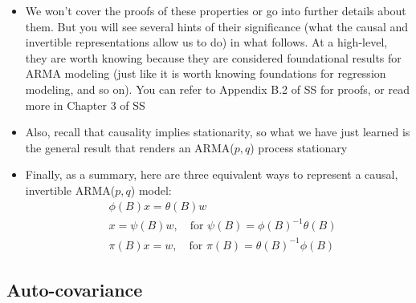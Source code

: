 \documentclass{article}
\begin{document}
\begin{itemize}
\item We won't cover the proofs of these properties or go into further details
  about them. But you will see several hints of their significance (what the
  causal and invertible representations allow us to do) in what follows. At 
  a high-level, they are worth knowing because they are considered foundational 
  results for ARMA modeling (just like it is worth knowing foundations for 
  regression modeling, and so on). You can refer to Appendix B.2 of SS for
  proofs, or read more in Chapter 3 of SS

\item Also, recall that causality implies stationarity, so what we have just
  learned is the general result that renders an ARMA($p,q$) process stationary 

\item Finally, as a summary, here are three equivalent ways to represent a
  causal, invertible ARMA($p,q$) model:
  \begin{align*}
  &\phi(B) x = \theta(B) w \\
  &x = \psi(B) w, \quad \text{for $\psi(B) = \phi(B)^{-1} \theta(B)$} \\
  &\pi(B) x = w, \quad \text{for $\pi(B) = \theta(B)^{-1} \phi(B)$}
  \end{align*}
\end{itemize}

\subsection{Auto-covariance}
\end{document}
